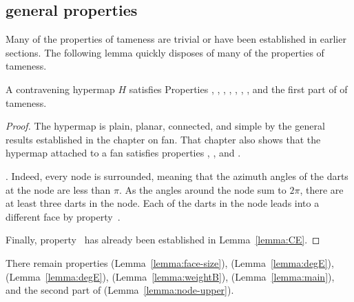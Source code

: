 \subsection{general properties}
\label{sec:startame}


Many of the properties of tameness are trivial or have been
established in earlier sections.  The following lemma quickly disposes
of many of the properties of tameness.

\begin{lemma}[]\label{lemma:multi}
  A contravening hypermap $H$ satisfies Properties ,
  , , , , , , and the first
  part of 
of tameness.
\end{lemma}

\begin{proof}
  The hypermap is plain, planar, connected, and simple by the general
  results established in the chapter on fan.  That chapter also shows
  that the hypermap attached to a fan satisfies properties
  , , and .

  .  Indeed, every node is
  surrounded, meaning that the azimuth angles of the darts at the
  node are less than $\pi$.  As the angles around the node sum to
  $2\pi$, there are at least three darts in the node. Each of the
  darts in the node leads into a different face by
  property~.

  Finally, property~ has already been established in
  Lemma~\ref{lemma:CE}.
\end{proof}

There remain properties 
(Lemma~\ref{lemma:face-size}), %
 (Lemma~\ref{lemma:degE}), 
(Lemma~\ref{lemma:degE}), 
(Lemma~\ref{lemma:weightB}), 
(Lemma~\ref{lemma:main}), and the second part of 
(Lemma~\ref{lemma:node-upper}).


